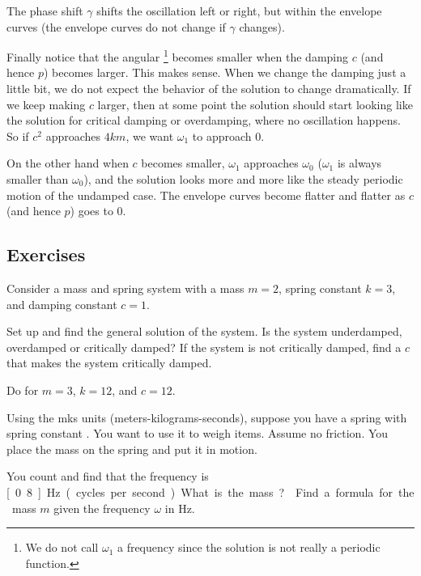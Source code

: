 The phase shift $\gamma$ shifts the oscillation left or right, but within the
envelope curves (the envelope curves do not change if $\gamma$
changes).


Finally notice that the angular \emph{}
\footnote{We do not call $\omega_1$ a frequency
since the solution is not really a periodic function.}  becomes
smaller when the damping $c$ (and hence $p$) becomes larger.  This makes sense.
When we change the damping just a little bit, we do not
expect the behavior of the solution to change dramatically.
If we keep making $c$ larger, then
at some point the solution should start looking 
like the solution for critical damping or overdamping, where no oscillation
happens.  So if $c^2$ approaches $4km$, we want $\omega_1$ to approach 0.

On the other hand when $c$ becomes smaller, $\omega_1$ approaches $\omega_0$
($\omega_1$ is always smaller than $\omega_0$), and the solution looks more and more like the steady
periodic motion of the undamped case.  The envelope curves become flatter and
flatter as $c$ (and hence $p$) goes to 0.

\subsection{Exercises}

\begin{samepage}
\begin{exercise} \label{mv:ex1}
Consider a mass and spring system with a mass $m=2$, spring constant $k=3$, and
damping constant $c=1$.
\begin{tasks}
\task Set up and find the general solution of the system.
\task Is the system underdamped, overdamped or critically damped?
\task If the system is not critically damped, find a $c$ that makes the system
critically damped.
\end{tasks}
\end{exercise}
\end{samepage}

\begin{exercise}
Do  for
$m=3$, $k=12$, and $c=12$.
\end{exercise}

\begin{exercise} \label{mv:exwt1}
Using the mks units (meters-kilograms-seconds),
suppose you have a spring with spring constant .
You want to use
it to weigh items.  Assume no friction.  You place the mass on
the spring and put it in motion.
\begin{tasks}
\task You count and find that the frequency is
\unit[0.8]{Hz} (cycles per second).  What is the mass?
\task Find a formula for the mass $m$
given the frequency $\omega$ in \unit{Hz}.
\end{tasks}
\end{exercise}

